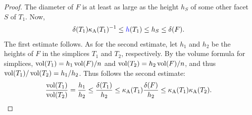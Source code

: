 \documentclass[10pt,a4paper]{article}
\begin{document}
\begin{proof}
    The diameter of $F$ is at least as large as the height $h_S$ of some other facet $S$ of $T_{1}$. 
    Now, 
    \begin{align*}
        \diam(T_{1}) \aspectratio(T_{1})^{-1} \leq \height(T_{1}) \leq h_S \leq \diam(F).
    \end{align*}
    The first estimate follows. 
    As for the second estimate,
    let $h_1$ and $h_2$ be the heights of $F$ in the simplices $T_1$ and $T_2$, respectively. 
    By the volume formula for simplices, $\operatorname{vol}(T_1) = h_1 \operatorname{vol}(F)/n$ and $\operatorname{vol}(T_2) = h_2 \operatorname{vol}(F)/n$, and thus $\operatorname{vol}(T_1)/\operatorname{vol}(T_2) = h_1/h_2$. Thus follows the second estimate: 
    \begin{align*}
        \frac{ \operatorname{vol}(T_1) }{ \operatorname{vol}(T_2) }
        = 
        \frac{ h_1 }{ h_2 }
        \leq
        \frac{ {\delta}(T_1) }{ h_2 }
        \leq
        \kappa_{\rm A}(T_{1}) \frac{ {\delta}(F) }{ h_2 }
        \leq
        \kappa_{\rm A}(T_{1}) \kappa_{\rm A}(T_{2})
        .
    \end{align*}

\end{proof}
\end{document}
